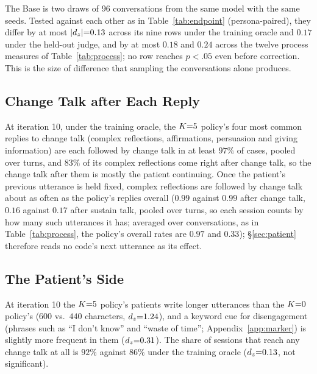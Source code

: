 The Base is two draws of 96 conversations from the same model with the same seeds. Tested against
each other as in Table~\ref{tab:endpoint} (persona-paired), they differ by at most $|d_z|{=}0.13$
across its nine rows under the training oracle and $0.17$ under the held-out judge, and
by at most $0.18$ and $0.24$ across the twelve process measures of Table~\ref{tab:process}; no row
reaches $p < .05$ even before correction. This is the size of difference that sampling the
conversations alone produces.

\subsection{Change Talk after Each Reply}
\label{app:reply}

At iteration 10, under the training oracle, the $K{=}5$ policy's four most common replies to change talk
(complex reflections, affirmations, persuasion and giving information) are each followed by change
talk in at least $97\%$ of cases, pooled over turns, and $83\%$ of its complex reflections come
right after change talk, so the change talk after them is mostly the patient continuing. Once the
patient's previous utterance is held fixed, complex reflections are followed by change talk about as
often as the policy's replies overall ($0.99$ against $0.99$ after change talk, $0.16$ against $0.17$
after sustain talk, pooled over turns, so each session counts by how many such utterances it has;
averaged over conversations, as in Table~\ref{tab:process}, the policy's overall rates are $0.97$
and $0.33$); \S\ref{sec:patient} therefore reads no code's next utterance as its effect.

\subsection{The Patient's Side}
\label{app:patientside}

At iteration 10 the $K{=}5$ policy's patients write longer utterances
than the $K{=}0$ policy's ($600$ vs.\ $440$ characters, $d_z{=}1.24$), and a keyword cue for disengagement
(phrases such as ``I don't know'' and ``waste of time''; Appendix~\ref{app:marker}) is slightly
more frequent in them ($d_z{=}0.31$). The share of sessions that reach any change talk at all is
$92\%$ against $86\%$ under the training oracle ($d_z{=}0.13$, not significant).

